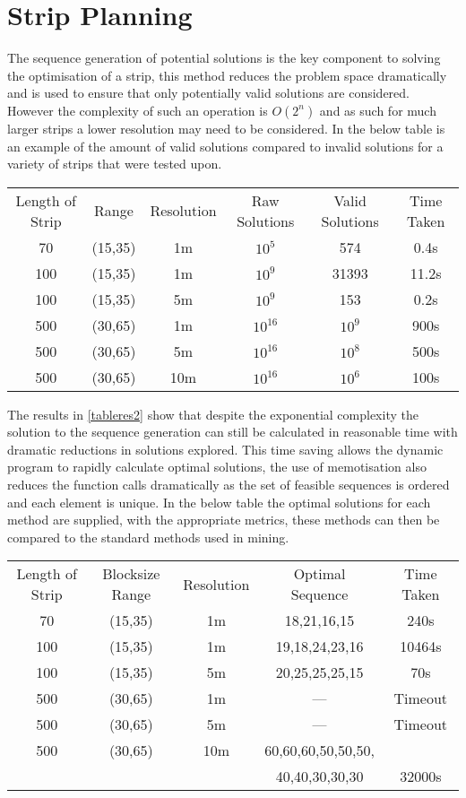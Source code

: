 \section{Strip Planning}
The sequence generation of potential solutions is the key component to solving the optimisation of a strip, this method reduces the problem space dramatically and is used to ensure that only potentially valid solutions are considered. However the complexity of such an operation is $O(2^n)$ and as such for much larger strips a lower resolution may need to be considered. In the below table is an example of the amount of valid solutions compared to invalid solutions for a variety of strips that were tested upon.
\begin{center}
\label{tableres2}
 \begin{tabular}{|c| c| c|c|c|c|} 
 \hline
 Length of Strip &  Range & Resolution & Raw Solutions & Valid Solutions & Time Taken\\ 
 70 & (15,35) & 1m & $10^5$ & 574 & 0.4s\\ 
 \hline
 100 & (15,35) & 1m & $10^9$ & 31393 & 11.2s\\
 \hline
 100 & (15,35)& 5m & $10^9$ & 153 & 0.2s\\
 \hline
 500 & (30,65)& 1m & $10^{16}$ & $10^9$ & 900s\\
 \hline
 500 & (30,65) & 5m & $10^{16}$ &$10^8$ & 500s \\ 
 \hline
 500 & (30,65) & 10m & $10^{16}$& $10^6$ & 100s\\ 
 \hline
\end{tabular}
\end{center}
 The results in \ref{tableres2} show that despite the exponential complexity the solution to the sequence generation can still be calculated in reasonable time with dramatic reductions in solutions explored. This time saving allows the dynamic program to rapidly calculate optimal solutions, the use of memotisation also reduces the function calls dramatically as the set of feasible sequences is ordered and each element is unique. In the below table the optimal solutions for each method are supplied, with the appropriate metrics, these methods can then be compared to the standard methods used in mining.
 \begin{center} 
  \begin{tabular}{|c| c| c|c|c|} 
 \hline
 Length of Strip & Blocksize Range & Resolution & Optimal Sequence & Time Taken\\ 
 70 & (15,35) & 1m  & 18,21,16,15 & 240s\\ 
 \hline
 100 & (15,35) & 1m  & 19,18,24,23,16 & 10464s\\
 \hline
 100 & (15,35)& 5m  & 20,25,25,25,15 & 70s\\
 \hline
 500 & (30,65)& 1m & ---& Timeout\\
 \hline
 500 & (30,65) & 5m  &--- & Timeout \\ 
 \hline
 500 & (30,65) & 10m &  60,60,60,50,50,50,& \\
 & & & 40,40,30,30,30 & 32000s\\ 
 \hline
\end{tabular}
\end{center}
